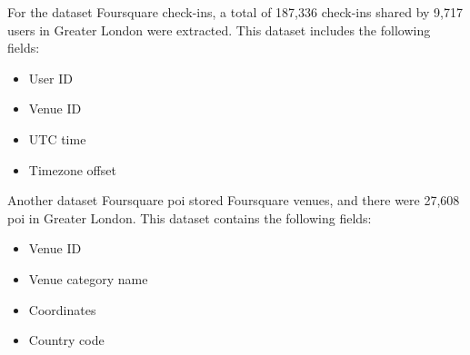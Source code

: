 \documentclass{article}
\begin{document}
For the dataset Foursquare check-ins, a total of 187,336 check-ins shared by 9,717 users in Greater London were extracted. This dataset includes the following fields:
\begin{itemize}
    \item User ID
    \item Venue ID
    \item UTC time
    \item Timezone offset
\end{itemize}

Another dataset Foursquare \acrshort{poi} stored Foursquare venues, and there were 27,608 \acrshort{poi} in Greater London. This dataset contains the following fields:
\begin{itemize}
    \item Venue ID
    \item Venue category name
    \item Coordinates
    \item Country code
\end{itemize}
\end{document}
